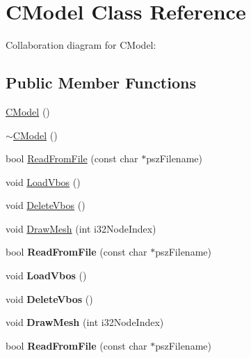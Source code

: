 \hypertarget{class_c_model}{\section{C\+Model Class Reference}
\label{class_c_model}
}


Collaboration diagram for C\+Model\+:
\subsection*{Public Member Functions}
\begin{DoxyCompactItemize}
\item 
\hyperlink{class_c_model_a1ea1e9d8dab5ad230fb3698ae3c7d742}{C\+Model} ()
\item 
\hyperlink{class_c_model_a10d40f6d5be633108b1f12e01878491f}{$\sim$\+C\+Model} ()
\item 
bool \hyperlink{class_c_model_a5f378cb1e12f725e846a5dd5754aab36}{Read\+From\+File} (const char $\ast$psz\+Filename)
\item 
void \hyperlink{class_c_model_a84f8239483c19666955aa261a48cce0a}{Load\+Vbos} ()
\item 
void \hyperlink{class_c_model_a929575453dd8ffd5858188239143aca8}{Delete\+Vbos} ()
\item 
void \hyperlink{class_c_model_a207c83bbf10a0bc60bc43852ed016b1b}{Draw\+Mesh} (int i32\+Node\+Index)
\item 
\hypertarget{class_c_model_a5f378cb1e12f725e846a5dd5754aab36}{bool {\bfseries Read\+From\+File} (const char $\ast$psz\+Filename)}\label{class_c_model_a5f378cb1e12f725e846a5dd5754aab36}

\item 
\hypertarget{class_c_model_a84f8239483c19666955aa261a48cce0a}{void {\bfseries Load\+Vbos} ()}\label{class_c_model_a84f8239483c19666955aa261a48cce0a}

\item 
\hypertarget{class_c_model_a929575453dd8ffd5858188239143aca8}{void {\bfseries Delete\+Vbos} ()}\label{class_c_model_a929575453dd8ffd5858188239143aca8}

\item 
\hypertarget{class_c_model_a207c83bbf10a0bc60bc43852ed016b1b}{void {\bfseries Draw\+Mesh} (int i32\+Node\+Index)}\label{class_c_model_a207c83bbf10a0bc60bc43852ed016b1b}

\item 
\hypertarget{class_c_model_a5f378cb1e12f725e846a5dd5754aab36}{bool {\bfseries Read\+From\+File} (const char $\ast$psz\+Filename)}\label{class_c_model_a5f378cb1e12f725e846a5dd5754aab36}


\end{DoxyCompactItemize}
